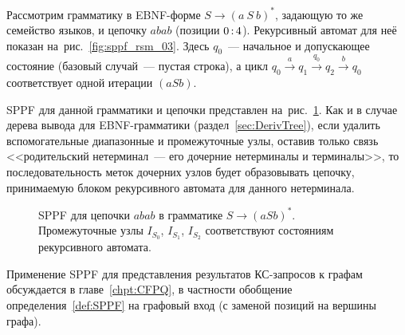 \begin{example}
	\label{exmpl:sppf_ebnf}
	Рассмотрим грамматику в EBNF-форме $S \to (a \ S \ b)^*$, задающую то же семейство языков, и цепочку $abab$ (позиции $0 \rng 4$).
	Рекурсивный автомат для неё показан на~рис.~\ref{fig:sppf_rsm_03}.
	Здесь $q_0$~--- начальное и допускающее состояние (базовый случай~--- пустая строка), а цикл $q_0 \xrightarrow{a} q_1 \xrightarrow{q_0} q_2 \xrightarrow{b} q_0$ соответствует одной итерации $(a S b)$.

	\begin{marginfigure}
		\begin{center}
			\resizebox{\marginparwidth}{!}{}
		\end{center}
		\caption{Рекурсивный автомат для грамматики $S \to (a S b)^*$.}
		\label{fig:sppf_rsm_03}
	\end{marginfigure}

	SPPF для данной грамматики и цепочки представлен на~рис.~\ref{fig:sppf_03}.
	Как и в случае дерева вывода для EBNF-грамматики (раздел~\ref{sec:DerivTree}), если удалить вспомогательные диапазонные и промежуточные узлы, оставив только связь <<родительский нетерминал~--- его дочерние нетерминалы и терминалы>>, то последовательность меток дочерних узлов будет образовывать цепочку, принимаемую блоком рекурсивного автомата для данного нетерминала.

	\begin{figure}[H]
		\begin{center}
			\resizebox{0.7\textwidth}{!}{}
		\end{center}
		\caption{SPPF для цепочки $abab$ в грамматике $S \to (a S b)^*$. Промежуточные узлы $I_{S_0}$, $I_{S_1}$, $I_{S_2}$ соответствуют состояниям рекурсивного автомата.}
		\label{fig:sppf_03}
	\end{figure}
\end{example}

Применение SPPF для представления результатов КС-запросов к графам обсуждается в главе~\ref{chpt:CFPQ}, в частности обобщение определения~\ref{def:SPPF} на графовый вход (с заменой позиций на вершины графа).
